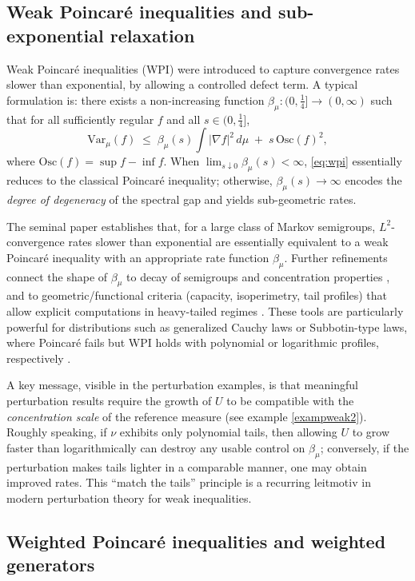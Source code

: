 \documentclass[11pt,reqno]{amsart}
\numberwithin{equation}{section}
\theoremstyle{definition}
\theoremstyle{remark}
\def \Var {\textrm{Var}}
\def \Osc {\textrm{Osc}}
\begin{document}
\subsection{Weak Poincar\'e inequalities and sub-exponential relaxation}

Weak Poincar\'e inequalities (WPI) were introduced to capture convergence rates slower than exponential, by allowing a controlled defect term. A typical formulation is: there exists a non-increasing function $\beta_\mu:(0,\tfrac14]\to(0,\infty)$ such that for all sufficiently regular $f$ and all $s\in(0,\tfrac14]$,
\begin{equation}\label{eq:wpi}
\Var_\mu(f)\;\le\; \beta_\mu(s)\int |\nabla f|^2\,d\mu \;+\; s\,\Osc(f)^2,
\end{equation}
where $\Osc(f)=\sup f-\inf f$.
When $\lim_{s\downarrow 0}\beta_\mu(s)<\infty$, \eqref{eq:wpi} essentially reduces to the classical Poincar\'e inequality; otherwise, $\beta_\mu(s)\to\infty$ encodes the \emph{degree of degeneracy} of the spectral gap and yields sub-geometric rates.

The seminal paper \cite{RW} establishes that, for a large class of Markov semigroups, $L^2$-convergence rates slower than exponential are essentially equivalent to a weak Poincar\'e inequality with an appropriate rate function $\beta_\mu$. Further refinements connect the shape of $\beta_\mu$ to decay of semigroups and concentration properties \cite{WangZhang2005}, and to geometric/functional criteria (capacity, isoperimetry, tail profiles) that allow explicit computations in heavy-tailed regimes \cite{BCR1,CGGR}.
These tools are particularly powerful for distributions such as generalized Cauchy laws or Subbotin-type laws, where Poincar\'e fails but WPI holds with polynomial or logarithmic profiles, respectively \cite{CGGR}.

A key message, visible in the perturbation examples, is that meaningful perturbation results require the growth of $U$ to be compatible with the \emph{concentration scale} of the reference measure (see example \ref{exampweak2}). Roughly speaking, if $\nu$ exhibits only polynomial tails, then allowing $U$ to grow faster than logarithmically can destroy any usable control on $\beta_\mu$; conversely, if the perturbation makes tails lighter in a comparable manner, one may obtain improved rates. This ``match the tails'' principle is a recurring leitmotiv in modern perturbation theory for weak inequalities.

\subsection{Weighted Poincar\'e inequalities and weighted generators}
\end{document}
